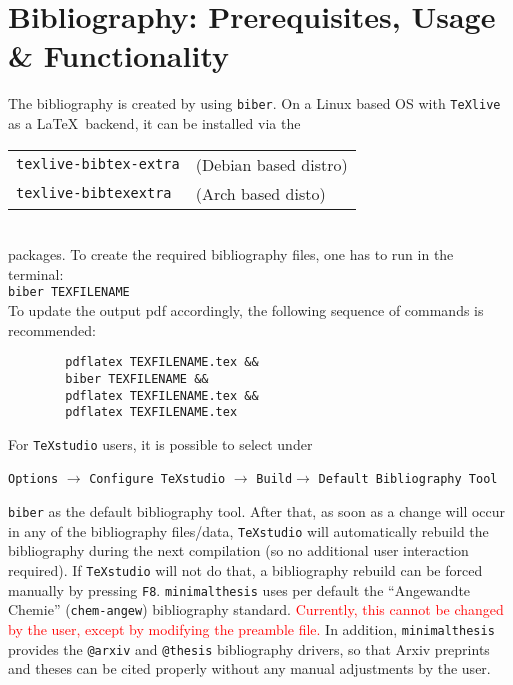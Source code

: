 \chapter{Bibliography: Prerequisites, Usage \& Functionality}
	The bibliography is created by using \verb|biber|. On a Linux based OS with \verb|TeXlive| as a \LaTeX~backend, it can be installed via the\\[0.125cm]
	\begin{tabular}{ll}
		\verb|texlive-bibtex-extra|& (Debian based distro)\\
		\verb|texlive-bibtexextra|& (Arch based disto)
	\end{tabular}\\
	packages.
	\newline To create the required bibliography files, one has to run in the terminal:\\
	\verb|biber TEXFILENAME|\\
	To update the output pdf accordingly, the following sequence of commands is recommended:\\[-1cm]
	\begin{verbatim}
		pdflatex TEXFILENAME.tex &&
		biber TEXFILENAME &&
		pdflatex TEXFILENAME.tex &&
		pdflatex TEXFILENAME.tex 
	\end{verbatim} 
	\vspace{-0.5cm}
	For \verb|TeXstudio| users, it is possible to select under\\[-1cm]
	\begin{center}
		\verb|Options| $\rightarrow$ 
		\verb|Configure TeXstudio| $\rightarrow$
		\verb|Build|$ \rightarrow$
		\verb|Default Bibliography Tool| 
	\end{center}
	\vspace{-0.5cm}
	\verb|biber| as the default bibliography tool. After that, as soon as a change will occur in any of the bibliography files/data, \verb|TeXstudio| will automatically rebuild the bibliography during the next compilation (so no additional user interaction required). If \verb|TeXstudio| will not do that, a bibliography rebuild can be forced manually by pressing \verb|F8|.
	\newline \verb|minimalthesis| uses per default the \enquote{Angewandte Chemie} (\verb|chem-angew|) bibliography standard. \textcolor{red}{Currently, this cannot be changed by the user, except by modifying the preamble file.} 
	\newline In addition, \verb|minimalthesis| provides the \verb|@arxiv| \cite{arxivExample} and \verb|@thesis| \cite{thesisExample} bibliography drivers, so that Arxiv preprints and theses can be cited properly without any manual adjustments by the user.